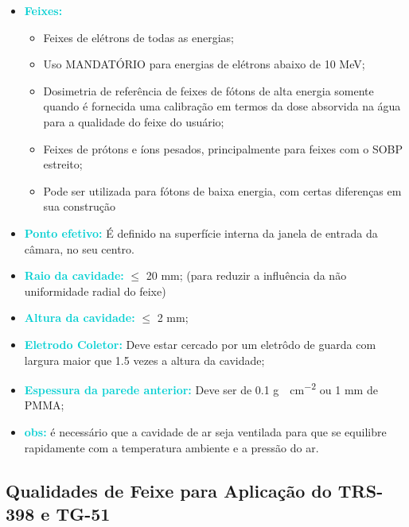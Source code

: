 \documentclass[11pt,a4paper]{article}
\newcounter{exemplo}
\begin{document}
	\begin{exemplo}
		\begin{itemize}[label=\textcolor{CarnationPink}{$\blacktriangleright$}]
			\item \textcolor{DarkTurquoise}{\LobsterTwo\textbf{Feixes:}}
				\begin{itemize}[label=\textcolor{CarnationPink}{$\star$}]
					\item Feixes de elétrons de todas as energias;
					\item Uso MANDATÓRIO para energias de elétrons abaixo de 10 MeV;
					\item Dosimetria de referência de feixes de fótons de alta energia somente quando é fornecida uma calibração em termos da dose absorvida na água para a qualidade do feixe do usuário;
					\item Feixes de prótons e íons pesados, principalmente para feixes com o SOBP estreito;
					\item Pode ser utilizada para fótons de baixa energia, com certas diferenças em sua construção
				\end{itemize}
			\item \textcolor{DarkTurquoise}{\LobsterTwo\textbf{Ponto efetivo:}} É definido na superfície interna da janela de entrada da câmara, no seu centro.
			\item \textcolor{DarkTurquoise}{\LobsterTwo\textbf{Raio da cavidade:}} $\leq$ 20 mm; (para reduzir a influência da não uniformidade radial do feixe)
			\item \textcolor{DarkTurquoise}{\LobsterTwo\textbf{Altura da cavidade:}}  $\leq$ 2 mm;
			\item \textcolor{DarkTurquoise}{\LobsterTwo\textbf{Eletrodo Coletor:}} Deve estar cercado por um eletrôdo de guarda com largura maior que 1.5 vezes a altura da cavidade;
			\item \textcolor{DarkTurquoise}{\LobsterTwo\textbf{Espessura da parede anterior:}} Deve ser de 0.1 \unit{g \cdot cm^{-2}} ou 1 mm de PMMA;
			\item \textcolor{DarkTurquoise}{\LobsterTwo\textbf{obs:}} é necessário que a cavidade de ar seja ventilada para que se equilibre rapidamente com a temperatura ambiente e a pressão do ar.
		\end{itemize}		
	\end{exemplo}

	\subsection*{Qualidades de Feixe para Aplicação do TRS-398 e TG-51}
\end{document}
